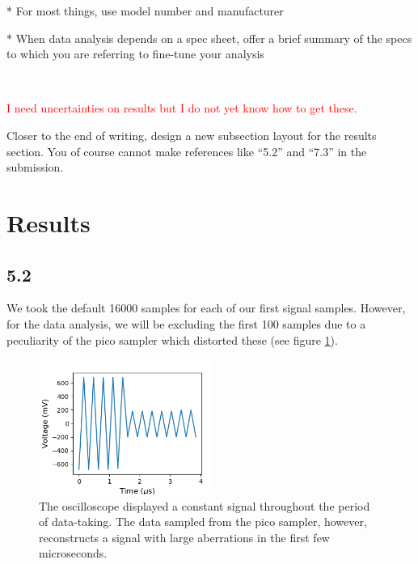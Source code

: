 \documentclass[a4paper]{article}
\begin{document}
* For most things, use model number and manufacturer

* When data analysis depends on a spec sheet, offer a brief summary of the specs to which you are referring to fine-tune your analysis

\

\textcolor{red}{I need uncertainties on results but I do not yet know how to get these.}

Closer to the end of writing, design a new subsection layout for the results section. You of course cannot make references like ``5.2'' and ``7.3'' in the submission.

\section{Results}

\subsection{5.2}

\quad \quad We took the default 16000 samples for each of our first signal samples. However, for the data analysis, we will be excluding the first 100 samples due to a peculiarity of the pico sampler which distorted these (see figure \ref{fig:pico_start}).


\begin{figure}
\centering
\includegraphics[width=0.5\textwidth]{5-2/pico_bad}
\caption{The oscilloscope displayed a constant signal throughout the period of data-taking. The data sampled from the pico sampler, however, reconstructs a signal with large aberrations in the first few microseconds.}
\label{fig:pico_start}
\end{figure}
\end{document}
